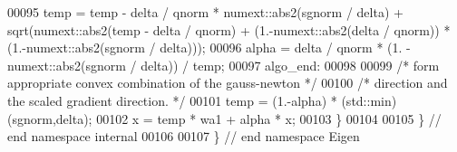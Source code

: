 \begin{DoxyCode}
00095     temp = temp - delta / qnorm * numext::abs2(sgnorm / delta) + sqrt(numext::abs2(temp - delta / qnorm) + 
      (1.-numext::abs2(delta / qnorm)) * (1.-numext::abs2(sgnorm / delta)));
00096     alpha = delta / qnorm * (1. - numext::abs2(sgnorm / delta)) / temp;
00097 algo\_end:
00098 
00099     \textcolor{comment}{/* form appropriate convex combination of the gauss-newton */}
00100     \textcolor{comment}{/* direction and the scaled gradient direction. */}
00101     temp = (1.-alpha) * (std::min)(sgnorm,delta);
00102     x = temp * wa1 + alpha * x;
00103 \}
00104 
00105 \} \textcolor{comment}{// end namespace internal}
00106 
00107 \} \textcolor{comment}{// end namespace Eigen}
\end{DoxyCode}
